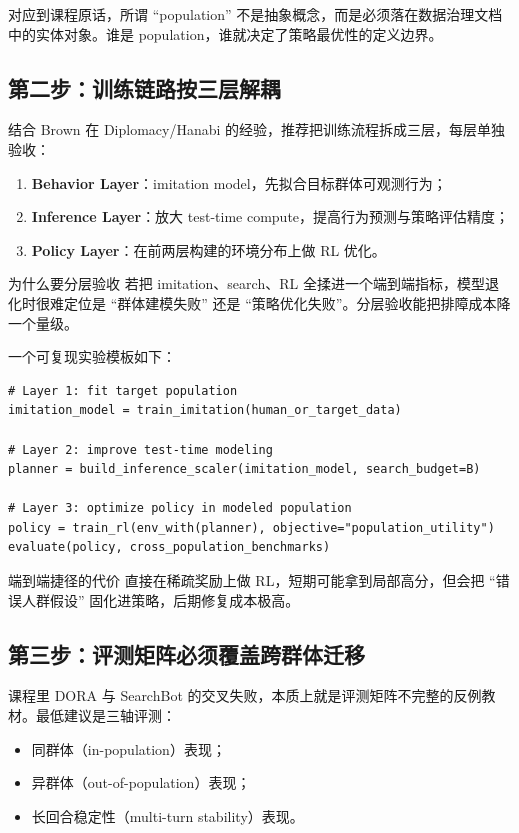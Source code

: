 \documentclass[a4paper]{article}
\begin{document}
对应到课程原话，所谓 ``population'' 不是抽象概念，而是必须落在数据治理文档中的实体对象。谁是 population，谁就决定了策略最优性的定义边界。

\subsection{第二步：训练链路按三层解耦}
结合 Brown 在 Diplomacy/Hanabi 的经验，推荐把训练流程拆成三层，每层单独验收：
\begin{enumerate}
    \item \textbf{Behavior Layer}：imitation model，先拟合目标群体可观测行为；
    \item \textbf{Inference Layer}：放大 test-time compute，提高行为预测与策略评估精度；
    \item \textbf{Policy Layer}：在前两层构建的环境分布上做 RL 优化。
\end{enumerate}

\begin{knowledgebox}{为什么要分层验收}
若把 imitation、search、RL 全揉进一个端到端指标，模型退化时很难定位是 ``群体建模失败'' 还是 ``策略优化失败''。分层验收能把排障成本降一个量级。
\end{knowledgebox}

一个可复现实验模板如下：
\begin{lstlisting}[caption={面向多人协作任务的三层训练模板}]
# Layer 1: fit target population
imitation_model = train_imitation(human_or_target_data)

# Layer 2: improve test-time modeling
planner = build_inference_scaler(imitation_model, search_budget=B)

# Layer 3: optimize policy in modeled population
policy = train_rl(env_with(planner), objective="population_utility")
evaluate(policy, cross_population_benchmarks)
\end{lstlisting}

\begin{warningbox}{端到端捷径的代价}
直接在稀疏奖励上做 RL，短期可能拿到局部高分，但会把 ``错误人群假设'' 固化进策略，后期修复成本极高。
\end{warningbox}

\subsection{第三步：评测矩阵必须覆盖跨群体迁移}
课程里 DORA 与 SearchBot 的交叉失败，本质上就是评测矩阵不完整的反例教材。最低建议是三轴评测：
\begin{itemize}
    \item 同群体（in-population）表现；
    \item 异群体（out-of-population）表现；
    \item 长回合稳定性（multi-turn stability）表现。
\end{itemize}
\end{document}
